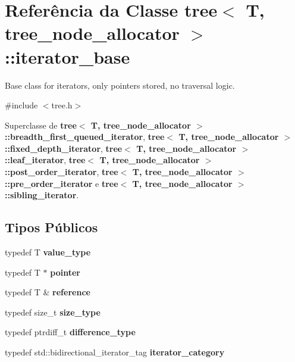 \section{Referência da Classe tree$<$ T, tree\+\_\+node\+\_\+allocator $>$\+:\+:iterator\+\_\+base}
\label{classtree_1_1iterator__base}


Base class for iterators, only pointers stored, no traversal logic.  




{\ttfamily \#include $<$tree.\+h$>$}



Superclasse de {\bf tree$<$ T, tree\+\_\+node\+\_\+allocator $>$\+::breadth\+\_\+first\+\_\+queued\+\_\+iterator}, {\bf tree$<$ T, tree\+\_\+node\+\_\+allocator $>$\+::fixed\+\_\+depth\+\_\+iterator}, {\bf tree$<$ T, tree\+\_\+node\+\_\+allocator $>$\+::leaf\+\_\+iterator}, {\bf tree$<$ T, tree\+\_\+node\+\_\+allocator $>$\+::post\+\_\+order\+\_\+iterator}, {\bf tree$<$ T, tree\+\_\+node\+\_\+allocator $>$\+::pre\+\_\+order\+\_\+iterator} e {\bf tree$<$ T, tree\+\_\+node\+\_\+allocator $>$\+::sibling\+\_\+iterator}.

\subsection*{Tipos Públicos}
\begin{DoxyCompactItemize}
\item 
typedef T {\bf value\+\_\+type}
\item 
typedef T $\ast$ {\bf pointer}
\item 
typedef T \& {\bf reference}
\item 
typedef size\+\_\+t {\bf size\+\_\+type}
\item 
typedef ptrdiff\+\_\+t {\bf difference\+\_\+type}
\item 
typedef std\+::bidirectional\+\_\+iterator\+\_\+tag {\bf iterator\+\_\+category}
\end{DoxyCompactItemize}
